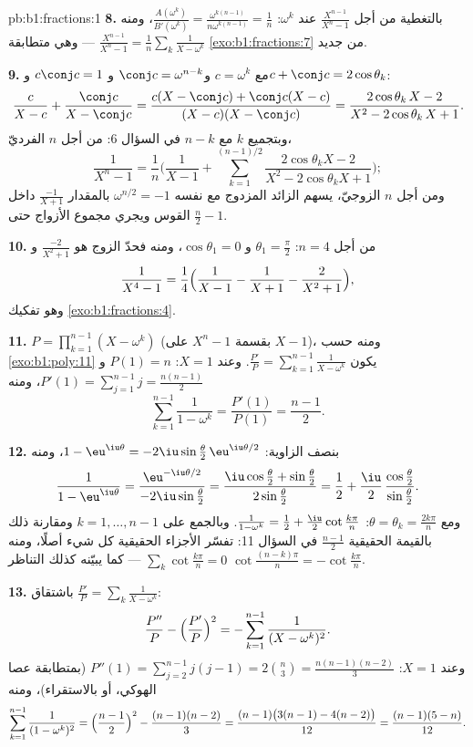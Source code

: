 \begin{solution}{pb:b1:fractions:1}
\textbf{8.} بالتغطية من أجل $\frac{X^{n-1}}{X^n - 1}$ عند $\omega^k$:
$\frac{A(\omega^k)}{B'(\omega^k)} =
\frac{\omega^{k(n-1)}}{n\omega^{k(n-1)}} = \frac1n$، ومنه
$\frac{X^{n-1}}{X^n-1} = \frac1n\sum_k\frac1{X - \omega^k}$ ---
وهي متطابقة \cref{exo:b1:fractions:7} من جديد.

\textbf{9.} مع $c = \omega^k$ و$\conj c = \omega^{n-k}$ و
$c\conj c = 1$ و$c + \conj c = 2\cos\theta_k$:
\[
\frac{c}{X - c} + \frac{\conj c}{X - \conj c}
= \frac{c(X - \conj c) + \conj c(X - c)}
{(X - c)(X - \conj c)}
= \frac{2\cos\theta_k\,X - 2}{X^2 - 2\cos\theta_k\,X + 1} .
\]
وبتجميع $k$ مع $n - k$ في السؤال 6: من أجل $n$ الفرديّ،
\[
\frac1{X^n - 1} = \frac1n\Biggl(\frac1{X-1} +
\sum_{k=1}^{(n-1)/2}
\frac{2\cos\theta_k X - 2}{X^2 - 2\cos\theta_k X + 1}\Biggr) ;
\]
ومن أجل $n$ الزوجيّ، يسهم  الزائد المزدوج مع نفسه $\omega^{n/2} = -1$
بالمقدار $\frac{-1}{X+1}$ داخل القوس ويجري مجموع
الأزواج حتى $\frac n2 - 1$.

\textbf{10.} من أجل $n = 4$: $\theta_1 = \frac\pi2$ و $\cos\theta_1 = 0$،
ومنه فحدّ الزوج هو $\frac{-2}{X^2+1}$ و
\[
\frac1{X^4-1} = \frac14\Bigl(\frac1{X-1} - \frac1{X+1}
- \frac2{X^2+1}\Bigr) ,
\]
وهو تفكيك \cref{exo:b1:fractions:4}.

\textbf{11.} $P = \prod_{k=1}^{n-1}(X - \omega^k)$ (بقسمة $X^n -
1$ على $X - 1$)، ومنه حسب \cref{exo:b1:poly:11} يكون $\frac{P'}P =
\sum_{k=1}^{n-1}\frac1{X-\omega^k}$. وعند $X = 1$: $P(1) = n$ و
$P'(1) = \sum_{j=1}^{n-1}j = \frac{n(n-1)}2$، ومنه
\[
\sum_{k=1}^{n-1}\frac1{1 - \omega^k}
= \frac{P'(1)}{P(1)} = \frac{n-1}2 .
\]

\textbf{12.} بنصف الزاوية: $1 - \eu^{\iu\theta} =
-2\iu\sin\frac\theta2\,\eu^{\iu\theta/2}$، ومنه
\[
\frac1{1 - \eu^{\iu\theta}}
= \frac{\eu^{-\iu\theta/2}}{-2\iu\sin\frac\theta2}
= \frac{\iu\cos\frac\theta2 + \sin\frac\theta2}
{2\sin\frac\theta2}
= \frac12 + \frac\iu2\,
\frac{\cos\frac\theta2}{\sin\frac\theta2} .
\]
ومع $\theta = \theta_k = \frac{2k\pi}n$: $\frac1{1-\omega^k} =
\frac12 + \frac\iu2\cot\frac{k\pi}n$. وبالجمع على $k = 1, \dots,
n-1$ ومقارنة ذلك بالقيمة الحقيقية $\frac{n-1}2$ في
السؤال 11: تفسّر الأجزاء الحقيقية كل شيء أصلًا، ومنه
$\sum_k\cot\frac{k\pi}n = 0$ --- كما يبيّنه كذلك التناظر $\cot\frac{(n-k)
\pi}n = -\cot\frac{k\pi}n$.

\textbf{13.} باشتقاق $\frac{P'}P = \sum_k\frac1{X -
\omega^k}$:
\[
\frac{P''}P - \Bigl(\frac{P'}P\Bigr)^2
= -\sum_{k=1}^{n-1}\frac1{(X - \omega^k)^2} .
\]
وعند $X = 1$: $P''(1) = \sum_{j=2}^{n-1}j(j-1) = 2\binom n3 =
\frac{n(n-1)(n-2)}3$ (بمتطابقة عصا الهوكي، أو بالاستقراء)، ومنه
\[
\sum_{k=1}^{n-1}\frac1{(1 - \omega^k)^2}
= \Bigl(\frac{n-1}2\Bigr)^2 - \frac{(n-1)(n-2)}3
= \frac{(n-1)\bigl(3(n-1) - 4(n-2)\bigr)}{12}
= \frac{(n-1)(5-n)}{12} .
\]


\end{solution}
